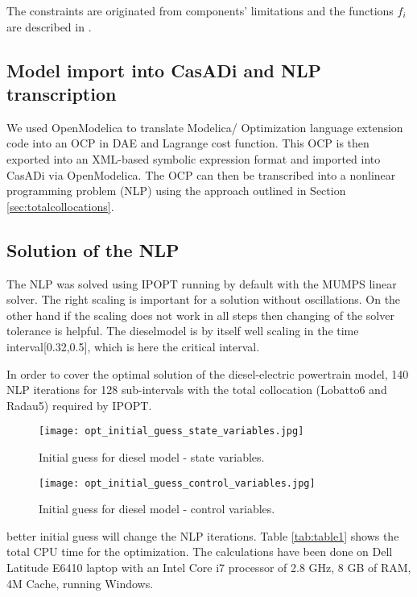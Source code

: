 The constraints are originated from components’ limitations and the functions $ f_i$  are described in \cite{sivertsson}.

\subsection{Model import into CasADi and NLP transcription}
\label{sec:optimizationxmlimport}

We used OpenModelica to translate Modelica/ Optimization
language extension code into an OCP in DAE and Lagrange
cost function. This OCP is then exported into an XML-based
symbolic expression format and imported into CasADi via
OpenModelica. The OCP can then be transcribed into a
nonlinear programming problem (NLP) using the approach
outlined in Section \ref{sec:totalcollocations}.

\subsection{Solution of the NLP}
\label{sec:optimizationnlp}

The NLP was solved using IPOPT \cite{wachter} running by default with the MUMPS linear solver.
The right scaling is important for a solution without oscillations.
On the other hand if the scaling does not work in all steps
then changing of the solver tolerance is helpful. The dieselmodel
is by itself well scaling in the time interval[0.32,0.5],
which is here the critical interval.

In order to cover the optimal solution of the diesel-electric
powertrain model, 140 NLP iterations for 128 sub-intervals
with the total collocation (Lobatto6 and Radau5) required by
IPOPT.

\begin{figure}
	\texttt{[image: opt\_initial\_guess\_state\_variables.jpg]}
	\caption{Initial guess for diesel model - state variables.}
	\label{fig:initialguessstatevariables}
\end{figure}

\begin{figure}
	\texttt{[image: opt\_initial\_guess\_control\_variables.jpg]}
	\caption{Initial guess for diesel model - control variables.}
	\label{fig:initialguesscontrolvariables}
\end{figure}


better initial guess will change the NLP iterations.
Table \ref{tab:table1} shows the total CPU time for the optimization. The calculations have been done on Dell Latitude E6410 laptop
with an Intel Core i7 processor of 2.8 GHz, 8 GB of RAM, 4M Cache, running Windows.

